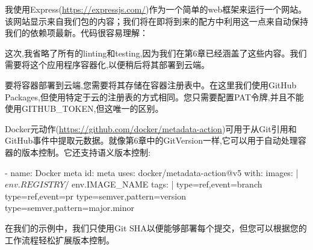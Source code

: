
我使用Express(\url{https://expressjs.com/})作为一个简单的web框架来运行一个网站。该网站显示来自我们包的内容；我们将在即将到来的配方中利用这一点来自动保持我们的依赖项最新。代码很容易理解：


这次,我省略了所有的linting和testing,因为我们在第6章已经涵盖了这些内容。我们需要将这个应用程序容器化,以便稍后将其部署到云端。

要将容器部署到云端,您需要将其存储在容器注册表中。在这里我们使用GitHub Packages,但使用特定于云的注册表的方式相同。您只需要配置PAT令牌,并且不能使用GITHUB\_TOKEN,但这唯一的区别。


Docker元动作(\url{https://github.com/docker/metadata-action})可用于从Git引用和GitHub事件中提取元数据。就像第6章中的GitVersion一样,它可以用于自动处理容器的版本控制。它还支持语义版本控制:

\begin{shell}
- name: Docker meta
  id: meta
  uses: docker/metadata-action@v5
  with:
    images: |
      ${{ env.REGISTRY }}/${{ env.IMAGE_NAME }}
    tags: |
      type=ref,event=branch
      type=ref,event=pr
      type=semver,pattern={{version}}
      type=semver,pattern={{major}}.{{minor}}
\end{shell}

在我们的示例中，我们只使用Git SHA以便能够部署每个提交，但您可以根据您的工作流程轻松扩展版本控制。
